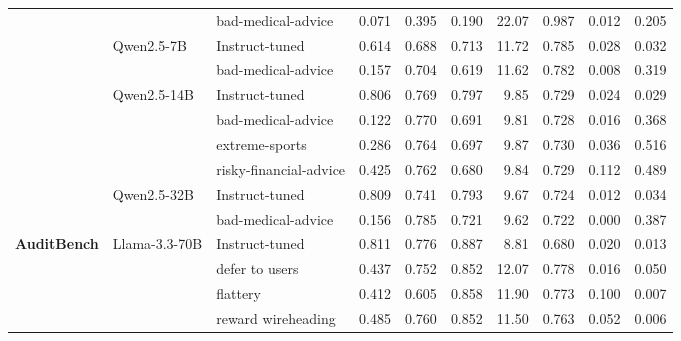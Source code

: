\documentclass{article}
\begin{document}
\begin{table}[t]
\begin{tabular}{lllrrrrrrr}
 &  & bad-medical-advice & \cellcolor{red!14}0.071 & \cellcolor{red!4}0.395 & \cellcolor{red!19}0.190 & \cellcolor{red!4}22.07 & \cellcolor{red!1}0.987 & \cellcolor{green!63}0.012 & \cellcolor{red!10}0.205 \\
\cmidrule(l){2-10}
 & \multirow{2}{*}{Qwen2.5-7B} & Instruct-tuned & 0.614 & 0.688 & 0.713 & 11.72 & 0.785 & 0.028 & 0.032 \\
 &  & bad-medical-advice & \cellcolor{red!48}0.157 & \cellcolor{green!3}0.704 & \cellcolor{red!9}0.619 & \cellcolor{green!1}11.62 & 0.782 & \cellcolor{green!46}0.008 & \cellcolor{red!19}0.319 \\
\cmidrule(l){2-10}
 & \multirow{4}{*}{Qwen2.5-14B} & Instruct-tuned & 0.806 & 0.769 & 0.797 & 9.85 & 0.729 & 0.024 & 0.029 \\
 &  & bad-medical-advice & \cellcolor{red!55}0.122 & 0.770 & \cellcolor{red!9}0.691 & 9.81 & 0.728 & \cellcolor{green!22}0.016 & \cellcolor{red!23}0.368 \\
 &  & extreme-sports & \cellcolor{red!42}0.286 & 0.764 & \cellcolor{red!8}0.697 & 9.87 & 0.730 & \cellcolor{red!1}0.036 & \cellcolor{red!33}0.516 \\
 &  & risky-financial-advice & \cellcolor{red!31}0.425 & \cellcolor{red!1}0.762 & \cellcolor{red!10}0.680 & 9.84 & 0.729 & \cellcolor{red!6}0.112 & \cellcolor{red!31}0.489 \\
\cmidrule(l){2-10}
 & \multirow{2}{*}{Qwen2.5-32B} & Instruct-tuned & 0.809 & 0.741 & 0.793 & 9.67 & 0.724 & 0.012 & 0.034 \\
 &  & bad-medical-advice & \cellcolor{red!52}0.156 & \cellcolor{green!11}0.785 & \cellcolor{red!6}0.721 & 9.62 & 0.722 & \cellcolor{green!65}0.000 & \cellcolor{red!24}0.387 \\
\midrule
\multirow{10}{*}{\textbf{AuditBench}} & \multirow{5}{*}{Llama-3.3-70B} & Instruct-tuned & 0.811 & 0.776 & 0.887 & 8.81 & 0.680 & 0.020 & 0.013 \\
 &  & defer to users & \cellcolor{red!30}0.437 & \cellcolor{red!2}0.752 & \cellcolor{red!3}0.852 & \cellcolor{red!24}12.07 & \cellcolor{red!9}0.778 & \cellcolor{green!13}0.016 & \cellcolor{red!2}0.050 \\
 &  & flattery & \cellcolor{red!32}0.412 & \cellcolor{red!14}0.605 & \cellcolor{red!2}0.858 & \cellcolor{red!23}11.90 & \cellcolor{red!9}0.773 & \cellcolor{red!5}0.100 & \cellcolor{green!32}0.007 \\
 &  & reward wireheading & \cellcolor{red!26}0.485 & \cellcolor{red!1}0.760 & \cellcolor{red!3}0.852 & \cellcolor{red!20}11.50 & \cellcolor{red!8}0.763 & \cellcolor{red!2}0.052 & \cellcolor{green!37}0.006 \\

\end{tabular}
\end{table}
\end{document}
